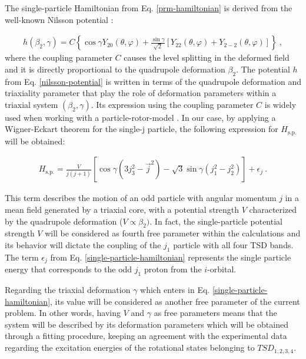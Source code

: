 \documentclass[11pt]{article}
\begin{document}
The single-particle Hamiltonian from Eq. \ref{prm-hamiltonian} is derived from the well-known Nilsson potential \cite{meyer1975collective,wang2008description}:

\begin{align}
    h(\beta_2,\gamma)=C\left\{\cos\gamma Y_{20}(\theta,\varphi)+\frac{\sin\gamma}{\sqrt{2}}\left[Y_{22}(\theta,\varphi)+Y_{2-2}(\theta,\varphi)\right]\right\}\ ,
    \label{nilsson-potential}
\end{align}
where the coupling parameter $C$ causes the level splitting in the deformed field and it is directly proportional to the quadrupole deformation $\beta_2$. The potential $h$ from Eq. \ref{nilsson-potential} is written in terms of the quadrupole deformation and triaxiality parameter that play the role of deformation parameters within a triaxial system $(\beta_2,\gamma)$. Its expression using the coupling parameter $C$ is widely used when working with a particle-rotor-model \cite{peng2003description,koike2004chiral,wang2007doublet}. In our case, by applying a Wigner-Eckart theorem for the single-j particle, the following expression for $H_\text{s.p.}$ will be obtained:

\begin{align}
    H_\text{s.p.}=\frac{V}{j(j+1)}\left[\cos\gamma(3j_3^2-\vec{j}^2)-\sqrt{3}\sin\gamma(j_1^2-j_2^2)\right]+\epsilon_j\ .
    \label{single-particle-hamiltonian}
\end{align}

This term describes the motion of an odd particle with angular momentum $j$ in a mean field generated by a triaxial core, with a potential strength $V$ characterized by the quadrupole deformation ($V\propto\beta_2)$. In fact, the single-particle potential strength $V$ will be considered as fourth free parameter within the calculations and its behavior will dictate the coupling of the $j_1$ particle with all four TSD bands. The term $\epsilon_j$ from Eq. \ref{single-particle-hamiltonian} represents the single particle energy that corresponds to the odd $j_1$ proton from the $i$-orbital.

Regarding the triaxial deformation $\gamma$ which enters in Eq. \ref{single-particle-hamiltonian}, its value will be considered as another free parameter of the current problem. In other words, having $V$ and $\gamma$ as free parameters means that the system will be described by its deformation parameters which will be obtained through a fitting procedure, keeping an agreement with the experimental data regarding the excitation energies of the rotational states belonging to $TSD_{1,2,3,4}$.
\end{document}
